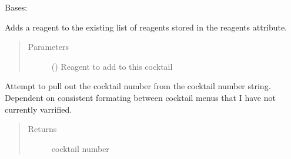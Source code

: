 \documentclass[letterpaper,10pt,english]{sphinxmanual}
\begin{document}
\begin{fulllineitems}
\label{\detokenize{polo.crystallography:polo.crystallography.cocktail.Cocktail}}
Bases: 

\begin{fulllineitems}
\label{\detokenize{polo.crystallography:polo.crystallography.cocktail.Cocktail.add_reagent}}
Adds a reagent to the existing list of reagents stored in the
reagents attribute.
\begin{quote}\begin{description}
\item[{Parameters}] \leavevmode
{} ({\hyperref[\detokenize{polo.crystallography:polo.crystallography.cocktail.Reagent}]{}}) \textendash{} Reagent to add to this cocktail

\end{description}\end{quote}

\end{fulllineitems}


\begin{fulllineitems}
\label{\detokenize{polo.crystallography:polo.crystallography.cocktail.Cocktail.cocktail_index}}
Attempt to pull out the cocktail number from the cocktail number
string. Dependent on consistent formating between cocktail menus that
I have not currently varrified.
\begin{quote}\begin{description}
\item[{Returns}] \leavevmode
cocktail number


\end{description}
\end{quote}
\end{fulllineitems}
\end{fulllineitems}
\end{document}
